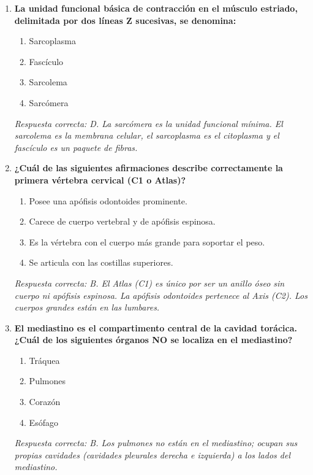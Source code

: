 \begin{enumerate}[label=\textbf{\arabic*.}]
    \item \textbf{La unidad funcional básica de contracción en el músculo estriado, delimitada por dos líneas Z sucesivas, se denomina:}
    \begin{enumerate}
        \item[A)] Sarcoplasma
        \item[B)] Fascículo
        \item[C)] Sarcolema
        \item[D)] Sarcómera
    \end{enumerate}
    \textit{Respuesta correcta: D. La sarcómera es la unidad funcional mínima. El sarcolema es la membrana celular, el sarcoplasma es el citoplasma y el fascículo es un paquete de fibras.}

    \item \textbf{¿Cuál de las siguientes afirmaciones describe correctamente la primera vértebra cervical (C1 o Atlas)?}
    \begin{enumerate}
        \item[A)] Posee una apófisis odontoides prominente.
        \item[B)] Carece de cuerpo vertebral y de apófisis espinosa.
        \item[C)] Es la vértebra con el cuerpo más grande para soportar el peso.
        \item[D)] Se articula con las costillas superiores.
    \end{enumerate}
    \textit{Respuesta correcta: B. El Atlas (C1) es único por ser un anillo óseo sin cuerpo ni apófisis espinosa. La apófisis odontoides pertenece al Axis (C2). Los cuerpos grandes están en las lumbares.}

    \item \textbf{El mediastino es el compartimento central de la cavidad torácica. ¿Cuál de los siguientes órganos NO se localiza en el mediastino?}
    \begin{enumerate}
        \item[A)] Tráquea
        \item[B)] Pulmones
        \item[C)] Corazón
        \item[D)] Esófago
    \end{enumerate}
    \textit{Respuesta correcta: B. Los pulmones no están en el mediastino; ocupan sus propias cavidades (cavidades pleurales derecha e izquierda) a los lados del mediastino.}


\end{enumerate}
